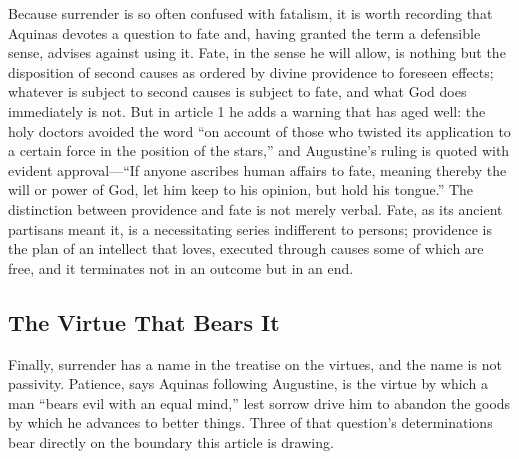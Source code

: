 Because surrender is so often confused with fatalism, it is worth recording that Aquinas devotes a question to fate and, having granted the term a defensible sense, advises against using it. Fate, in the sense he will allow, is nothing but the disposition of second causes as ordered by divine providence to foreseen effects; whatever is subject to second causes is subject to fate, and what God does immediately is not. But in article 1 he adds a warning that has aged well: the holy doctors avoided the word ``on account of those who twisted its application to a certain force in the position of the stars,'' and Augustine's ruling is quoted with evident approval---``If anyone ascribes human affairs to fate, meaning thereby the will or power of God, let him keep to his opinion, but hold his tongue.'' The distinction between providence and fate is not merely verbal. Fate, as its ancient partisans meant it, is a necessitating series indifferent to persons; providence is the plan of an intellect that loves, executed through causes some of which are free, and it terminates not in an outcome but in an end.

\subsection{The Virtue That Bears It}

Finally, surrender has a name in the treatise on the virtues, and the name is not passivity. Patience, says Aquinas following Augustine, is the virtue by which a man ``bears evil with an equal mind,'' lest sorrow drive him to abandon the goods by which he advances to better things. Three of that question's determinations bear directly on the boundary this article is drawing.

